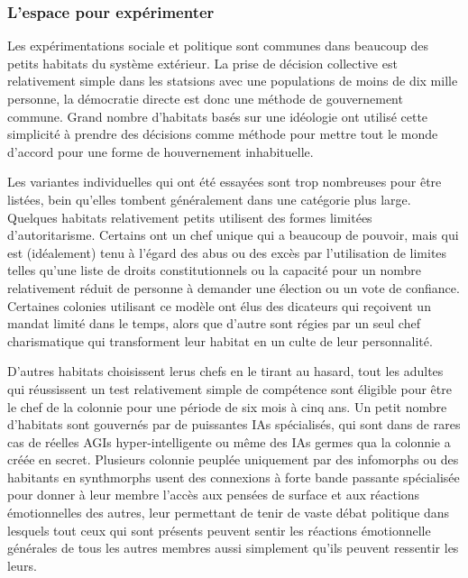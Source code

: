                \subsubsection{L'espace pour expérimenter} \label{sec:space-exper} 

               Les expérimentations sociale et politique sont communes dans beaucoup des petits habitats du système extérieur. La prise de décision collective est relativement simple dans les statsions avec une populations de moins de dix mille personne, la démocratie directe est donc une méthode de gouvernement commune. Grand nombre d'habitats basés sur une idéologie ont utilisé cette simplicité à prendre des décisions comme méthode pour mettre tout le monde d'accord pour une forme de houvernement inhabituelle. 

               Les variantes individuelles qui ont été essayées sont trop nombreuses pour être listées, bein qu'elles tombent généralement dans une catégorie plus large. Quelques habitats relativement petits utilisent des formes limitées d'autoritarisme. Certains ont un chef unique qui a beaucoup de pouvoir, mais qui est (idéalement) tenu à l'égard des abus ou des excès par l'utilisation de limites telles qu'une liste de droits constitutionnels ou la capacité pour un nombre relativement réduit de personne à demander une élection ou un vote de confiance. Certaines colonies utilisant ce modèle ont élus des dicateurs qui reçoivent un mandat limité dans le temps, alors que d'autre sont régies par un seul chef charismatique qui transforment leur habitat en un culte de leur personnalité. 

               D'autres habitats choisissent lerus chefs en le tirant au hasard, tout les adultes qui réussissent un test relativement simple de compétence sont éligible pour être le chef de la colonnie pour une période de six mois à cinq ans. Un petit nombre d'habitats sont gouvernés par de puissantes IAs spécialisés, qui sont dans de rares cas de réelles AGIs hyper-intelligente ou même des IAs germes qua la colonnie a créée en secret. Plusieurs colonnie peuplée uniquement par des infomorphs ou des habitants en synthmorphs usent des connexions à forte bande passante spécialisée pour donner à leur membre l'accès aux pensées de surface et aux réactions émotionnelles des autres, leur permettant de tenir de vaste débat politique dans lesquels tout ceux qui sont présents peuvent sentir les réactions émotionnelle générales de tous les autres membres aussi simplement qu'ils peuvent ressentir les leurs. 

